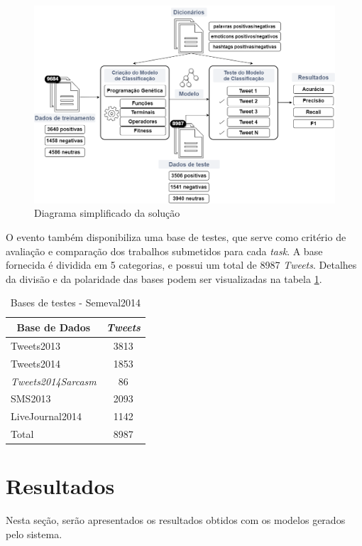 \documentclass[12pt]{article}
\begin{document}
\begin{figure}[H]
	\centering
	\includegraphics[width=1\textwidth]{diagrama3}
	\caption{Diagrama simplificado da solução}
	\label{diagrama}
\end{figure}

O evento também disponibiliza uma base de testes, que serve como critério de avaliação e comparação dos trabalhos submetidos para cada \emph{task}. A base fornecida é dividida em 5 categorias, e possui um total de 8987 \emph{Tweets}. Detalhes da divisão e da polaridade das bases podem ser visualizadas na tabela \ref{datasets}.

\begin{table}[H]
\centering
	\begin{tabular}{lc}
	\multicolumn{1}{c}{\textbf{Base de Dados}} & \textit{\textbf{Tweets}} \\ \hline
	Tweets2013 & 3813 \\ \hline
	Tweets2014 & 1853 \\ \hline
	\textit{Tweets2014Sarcasm} & 86 \\ \hline
	SMS2013 & 2093 \\ \hline
	LiveJournal2014 & 1142 \\ \hline
	Total & 8987
	\end{tabular}
\caption{Bases de testes - Semeval2014}
\label{datasets}
\end{table}

\section{Resultados}

Nesta seção, serão apresentados os resultados obtidos com os modelos gerados pelo sistema. 
\end{document}
